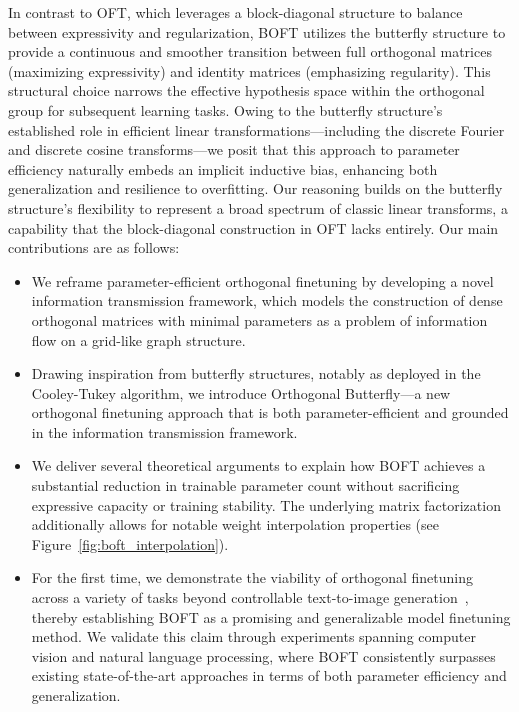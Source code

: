 In contrast to OFT, which leverages a block-diagonal structure to balance between expressivity and regularization, BOFT utilizes the butterfly structure to provide a continuous and smoother transition between full orthogonal matrices (maximizing expressivity) and identity matrices (emphasizing regularity). This structural choice narrows the effective hypothesis space within the orthogonal group for subsequent learning tasks. Owing to the butterfly structure’s established role in efficient linear transformations—including the discrete Fourier and discrete cosine transforms—we posit that this approach to parameter efficiency naturally embeds an implicit inductive bias, enhancing both generalization and resilience to overfitting. Our reasoning builds on the butterfly structure’s flexibility to represent a broad spectrum of classic linear transforms, a capability that the block-diagonal construction in OFT lacks entirely. Our main contributions are as follows:

\begin{itemize}[leftmargin=*,nosep]
    \item We reframe parameter-efficient orthogonal finetuning by developing a novel information transmission framework, which models the construction of dense orthogonal matrices with minimal parameters as a problem of information flow on a grid-like graph structure.
    \item Drawing inspiration from butterfly structures, notably as deployed in the Cooley-Tukey algorithm, we introduce Orthogonal Butterfly—a new orthogonal finetuning approach that is both parameter-efficient and grounded in the information transmission framework.
    \item We deliver several theoretical arguments to explain how BOFT achieves a substantial reduction in trainable parameter count without sacrificing expressive capacity or training stability. The underlying matrix factorization additionally allows for notable weight interpolation properties (see Figure~\ref{fig:boft_interpolation}).
    \item For the first time, we demonstrate the viability of orthogonal finetuning across a variety of tasks beyond controllable text-to-image generation~\cite{qiu2023controlling}, thereby establishing BOFT as a promising and generalizable model finetuning method. We validate this claim through experiments spanning computer vision and natural language processing, where BOFT consistently surpasses existing state-of-the-art approaches in terms of both parameter efficiency and generalization.
\end{itemize}

